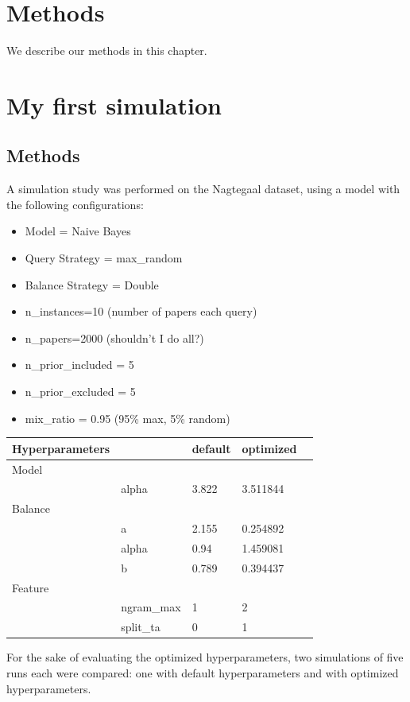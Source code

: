 \documentclass[
]{book}
\providecommand{\tightlist}{%
  \setlength{\itemsep}{0pt}\setlength{\parskip}{0pt}}
\begin{document}
\hypertarget{methods}{%
\chapter{Methods}\label{methods}}

We describe our methods in this chapter.

\hypertarget{my-first-simulation}{%
\chapter{My first simulation}\label{my-first-simulation}}

\hypertarget{methods-1}{%
\section{Methods}\label{methods-1}}

A simulation study was performed on the Nagtegaal dataset, using a model with the following configurations:

\begin{itemize}
\tightlist
\item
  Model = Naive Bayes
\item
  Query Strategy = max\_random
\item
  Balance Strategy = Double
\item
  n\_instances=10 (number of papers each query)
\item
  n\_papers=2000 (shouldn't I do all?)
\item
  n\_prior\_included = 5
\item
  n\_prior\_excluded = 5
\item
  mix\_ratio = 0.95 (95\% max, 5\% random)
\end{itemize}

\begin{longtable}[]{@{}lllll@{}}
\toprule
Hyperparameters & & default & optimized &\tabularnewline
\midrule
\endhead
Model & & & &\tabularnewline
& alpha & 3.822 & 3.511844 &\tabularnewline
Balance & & & &\tabularnewline
& a & 2.155 & 0.254892 &\tabularnewline
& alpha & 0.94 & 1.459081 &\tabularnewline
& b & 0.789 & 0.394437 &\tabularnewline
Feature & & & &\tabularnewline
& ngram\_max & 1 & 2 &\tabularnewline
& split\_ta & 0 & 1 &\tabularnewline
\bottomrule
\end{longtable}

For the sake of evaluating the optimized hyperparameters, two simulations of five runs each were compared: one with default hyperparameters and with optimized hyperparameters.
\end{document}
